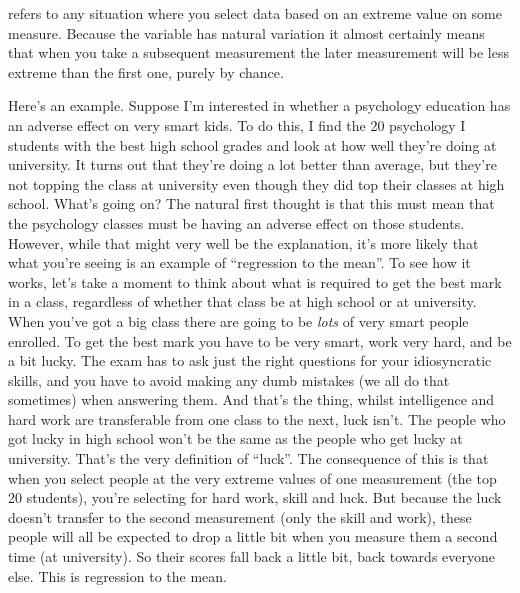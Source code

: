 
 refers to any situation where you select data based on an extreme value on some measure. Because the variable has natural variation it almost certainly means that when you take a subsequent measurement the later measurement will be less extreme than the first one, purely by chance. 

Here's an example. Suppose I'm interested in whether a psychology education has an adverse effect on very smart kids. To do this, I find the 20 psychology I students with the best high school grades and look at how well they're doing at university. It turns out that they're doing a lot better than average, but they're not topping the class at university even though they did top their classes at high school. What's going on? The natural first thought is that this must mean that the psychology classes must be having an adverse effect on those students. However, while that might very well be the explanation, it's more likely that what you're seeing is an example of ``regression to the mean''.  To see how it works, let's take a moment to think about what is required to get the best mark in a class, regardless of whether that class be at high school or at university. When you've got a big class there are going to be {\it lots} of very smart people enrolled. To get the best mark you have to be very smart, work very hard, and be a bit lucky. The exam has to ask just the right questions for your idiosyncratic skills, and you have to avoid making any dumb mistakes (we all do that sometimes) when answering them. And that's the thing, whilst intelligence and hard work are transferable from one class to the next, luck isn't. The people who got lucky in high school won't be the same as the people who get lucky at university. That's the very definition of ``luck''. The consequence of this is that when you select people at the very extreme values of one measurement (the top 20 students), you're selecting for hard work, skill and luck. But because the luck doesn't transfer to the second measurement (only the skill and work), these people will all be expected to drop a little bit when you measure them a second time (at university). So their scores fall back a little bit, back towards everyone else. This is regression to the mean.

